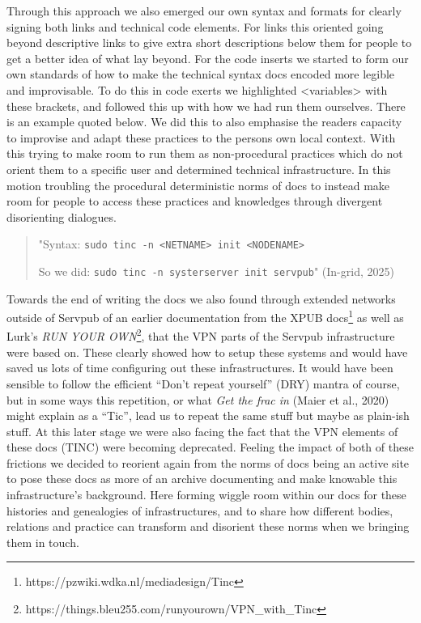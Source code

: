 Through this approach we also emerged our own syntax and formats for
clearly signing both links and technical code elements. For links this
oriented going beyond descriptive links to give extra short descriptions
below them for people to get a better idea of what lay beyond. For the
code inserts we started to form our own standards of how to make the
technical syntax docs encoded more legible and improvisable. To do this
in code exerts we highlighted \textless variables\textgreater{} with
these brackets, and followed this up with how we had run them ourselves.
There is an example quoted below. We did this to also emphasise the
readers capacity to improvise and adapt these practices to the persons
own local context. With this trying to make room to run them as
non-procedural practices which do not orient them to a specific user and
determined technical infrastructure. In this motion troubling the
procedural deterministic norms of docs to instead make room for people
to access these practices and knowledges through divergent disorienting
dialogues.

\begin{quote}
"Syntax:
\texttt{sudo\ tinc\ -n\ \textless{}NETNAME\textgreater{}\ init\ \textless{}NODENAME\textgreater{}}

So we did: \texttt{sudo\ tinc\ -n\ systerserver\ init\ servpub}"
(In-grid, 2025)
\end{quote}

Towards the end of writing the docs we also found through extended
networks outside of Servpub of an earlier documentation from the XPUB
docs\footnote{https://pzwiki.wdka.nl/mediadesign/Tinc} as well as Lurk's
\emph{RUN YOUR OWN}\footnote{https://things.bleu255.com/runyourown/VPN\_with\_Tinc},
that the VPN parts of the Servpub infrastructure were based on. These
clearly showed how to setup these systems and would have saved us lots
of time configuring out these infrastructures. It would have been
sensible to follow the efficient ``Don't repeat yourself'' (DRY) mantra
of course, but in some ways this repetition, or what \emph{Get the frac
in} (Maier et al., 2020) might explain as a ``Tic'', lead us to repeat
the same stuff but maybe as plain-ish stuff. At this later stage we were
also facing the fact that the VPN elements of these docs (TINC) were
becoming deprecated. Feeling the impact of both of these frictions we
decided to reorient again from the norms of docs being an active site to
pose these docs as more of an archive documenting and make knowable this
infrastructure's background. Here forming wiggle room within our docs
for these histories and genealogies of infrastructures, and to share how
different bodies, relations and practice can transform and disorient
these norms when we bringing them in touch.

